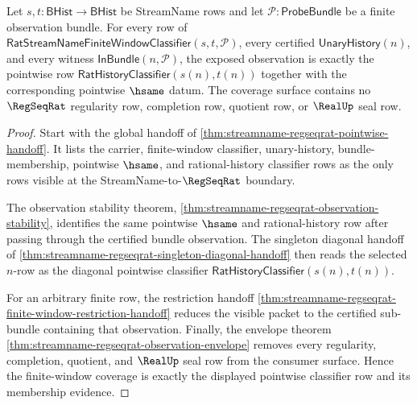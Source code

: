 \begin{theorem}
\label{thm:streamname-regseqrat-window-coverage}
Let $s,t:\mathsf{BHist}\to\mathsf{BHist}$ be StreamName rows and let
$\mathcal P:\mathsf{ProbeBundle}$ be a finite observation bundle. For every
row of $\mathsf{RatStreamNameFiniteWindowClassifier}(s,t,\mathcal P)$,
every certified $\mathsf{UnaryHistory}(n)$, and every witness
$\mathsf{InBundle}(n,\mathcal P)$, the exposed observation is exactly the
pointwise row $\mathsf{RatHistoryClassifier}(s(n),t(n))$ together with the
corresponding pointwise $\hsame$ datum. The coverage surface contains no
$\RegSeqRat$ regularity row, completion row, quotient row, or $\RealUp$ seal
row.
\end{theorem}
\begin{proof}
Start with the global handoff of
\autoref{thm:streamname-regseqrat-pointwise-handoff}. It lists the carrier,
finite-window classifier, unary-history, bundle-membership, pointwise
$\hsame$, and rational-history classifier rows as the only rows visible at
the StreamName-to-$\RegSeqRat$ boundary.

The observation stability theorem,
\autoref{thm:streamname-regseqrat-observation-stability}, identifies the
same pointwise $\hsame$ and rational-history row after passing through the
certified bundle observation. The singleton diagonal handoff of
\autoref{thm:streamname-regseqrat-singleton-diagonal-handoff} then reads the
selected $n$-row as the diagonal pointwise classifier
$\mathsf{RatHistoryClassifier}(s(n),t(n))$.

For an arbitrary finite row, the restriction handoff
\autoref{thm:streamname-regseqrat-finite-window-restriction-handoff} reduces
the visible packet to the certified sub-bundle containing that observation.
Finally, the envelope theorem
\autoref{thm:streamname-regseqrat-observation-envelope} removes every
regularity, completion, quotient, and $\RealUp$ seal row from the consumer
surface. Hence the finite-window coverage is exactly the displayed pointwise
classifier row and its membership evidence.
\end{proof}

